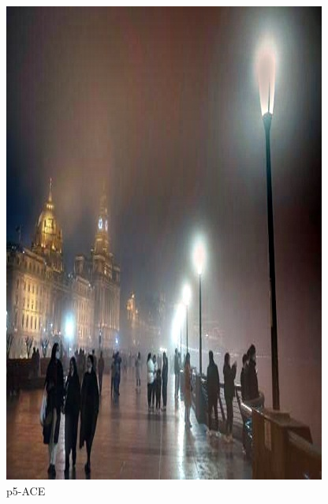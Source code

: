 \documentclass[12pt]{article}
\begin{document}
\begin{figure}[!h]
\begin{minipage}[t]{0.24\linewidth}
        \includegraphics[width=0.9\linewidth]{sample_pictures/after_p5_ACE.jpg}
        \caption*{p5-ACE}
    \end{minipage}\begin{minipage}[t]{0.24\linewidth}
        \centering

\end{minipage}
\end{figure}
\end{document}
